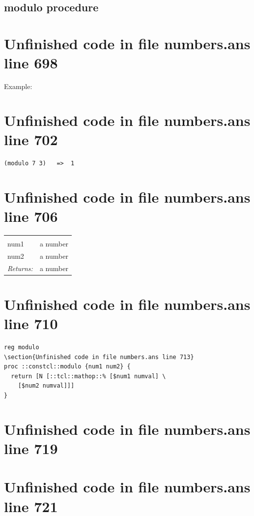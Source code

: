 \documentclass[twoside,9pt]{report}
\begin{document}
\subsection{modulo procedure}
\label{modulo-procedure}

\section{Unfinished code in file numbers.ans line 698}


Example:

\section{Unfinished code in file numbers.ans line 702}
\begin{verbatim}
(modulo 7 3)   =>  1
\end{verbatim}
\section{Unfinished code in file numbers.ans line 706}
\noindent\begin{tabular}{ |p{1.9cm} p{8cm}| }
\hline
\rowcolor[HTML]{CCCCCC} \multicolumn{2}{|l|}{\bf modulo (public)} \\
num1 & a number \\
num2 & a number \\
\textit{Returns:} & a number \\
\hline
\end{tabular}
\section{Unfinished code in file numbers.ans line 710}
\begin{lstlisting}
reg modulo
\section{Unfinished code in file numbers.ans line 713}
proc ::constcl::modulo {num1 num2} {
  return [N [::tcl::mathop::% [$num1 numval] \
    [$num2 numval]]]
}
\end{lstlisting}
\section{Unfinished code in file numbers.ans line 719}
\section{Unfinished code in file numbers.ans line 721}
\end{document}
